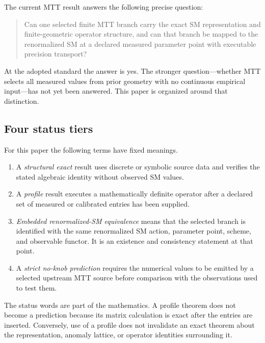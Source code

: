\documentclass[11pt]{article}
\begin{document}
The current MTT result answers the following precise question:

\begin{quote}
Can one selected finite MTT branch carry the exact SM representation and finite-geometric
operator structure, and can that branch be mapped to the renormalized SM at a declared
measured parameter point with executable precision transport?
\end{quote}

At the adopted standard the answer is yes.  The stronger question---whether MTT selects all
measured values from prior geometry with no continuous empirical input---has not yet been
answered.  This paper is organized around that distinction.

\subsection{Four status tiers}

\begin{definition}
For this paper the following terms have fixed meanings.
\begin{enumerate}[label=(\roman*)]
\item A \emph{structural exact} result uses discrete or symbolic source data and verifies the
stated algebraic identity without observed SM values.
\item A \emph{profile} result executes a mathematically definite operator after a declared set
of measured or calibrated entries has been supplied.
\item \emph{Embedded renormalized-SM equivalence} means that the selected branch is identified
with the same renormalized SM action, parameter point, scheme, and observable functor.  It is an
existence and consistency statement at that point.
\item A \emph{strict no-knob prediction} requires the numerical values to be emitted by a
selected upstream MTT source before comparison with the observations used to test them.
\end{enumerate}
\end{definition}

The status words are part of the mathematics.  A profile theorem does not become a prediction
because its matrix calculation is exact after the entries are inserted.  Conversely, use of a
profile does not invalidate an exact theorem about the representation, anomaly lattice, or
operator identities surrounding it.
\end{document}
